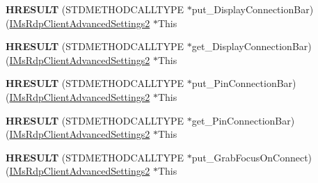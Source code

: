 \begin{DoxyCompactItemize}
\item 
\mbox{\label{struct_m_s_t_s_c_lib_1_1_i_ms_rdp_client_advanced_settings2_vtbl_ac35cbb3228dacc2c6289222c6b4a703f}} 
{\bfseries H\+R\+E\+S\+U\+LT} (S\+T\+D\+M\+E\+T\+H\+O\+D\+C\+A\+L\+L\+T\+Y\+PE $\ast$put\+\_\+\+Display\+Connection\+Bar)(\hyperlink{interface_m_s_t_s_c_lib_1_1_i_ms_rdp_client_advanced_settings2}{I\+Ms\+Rdp\+Client\+Advanced\+Settings2} $\ast$This
\item 
\mbox{\label{struct_m_s_t_s_c_lib_1_1_i_ms_rdp_client_advanced_settings2_vtbl_a38d3399d8e4496cb8055bca8e0daa706}} 
{\bfseries H\+R\+E\+S\+U\+LT} (S\+T\+D\+M\+E\+T\+H\+O\+D\+C\+A\+L\+L\+T\+Y\+PE $\ast$get\+\_\+\+Display\+Connection\+Bar)(\hyperlink{interface_m_s_t_s_c_lib_1_1_i_ms_rdp_client_advanced_settings2}{I\+Ms\+Rdp\+Client\+Advanced\+Settings2} $\ast$This
\item 
\mbox{\label{struct_m_s_t_s_c_lib_1_1_i_ms_rdp_client_advanced_settings2_vtbl_a02401a613d95616fcfa7d5df394a37dc}} 
{\bfseries H\+R\+E\+S\+U\+LT} (S\+T\+D\+M\+E\+T\+H\+O\+D\+C\+A\+L\+L\+T\+Y\+PE $\ast$put\+\_\+\+Pin\+Connection\+Bar)(\hyperlink{interface_m_s_t_s_c_lib_1_1_i_ms_rdp_client_advanced_settings2}{I\+Ms\+Rdp\+Client\+Advanced\+Settings2} $\ast$This
\item 
\mbox{\label{struct_m_s_t_s_c_lib_1_1_i_ms_rdp_client_advanced_settings2_vtbl_a27e24dda249635ca95ca5f88cfa25ff3}} 
{\bfseries H\+R\+E\+S\+U\+LT} (S\+T\+D\+M\+E\+T\+H\+O\+D\+C\+A\+L\+L\+T\+Y\+PE $\ast$get\+\_\+\+Pin\+Connection\+Bar)(\hyperlink{interface_m_s_t_s_c_lib_1_1_i_ms_rdp_client_advanced_settings2}{I\+Ms\+Rdp\+Client\+Advanced\+Settings2} $\ast$This
\item 
\mbox{\label{struct_m_s_t_s_c_lib_1_1_i_ms_rdp_client_advanced_settings2_vtbl_acf372a510757f19a62d46dedf5a98d6a}} 
{\bfseries H\+R\+E\+S\+U\+LT} (S\+T\+D\+M\+E\+T\+H\+O\+D\+C\+A\+L\+L\+T\+Y\+PE $\ast$put\+\_\+\+Grab\+Focus\+On\+Connect)(\hyperlink{interface_m_s_t_s_c_lib_1_1_i_ms_rdp_client_advanced_settings2}{I\+Ms\+Rdp\+Client\+Advanced\+Settings2} $\ast$This

\end{DoxyCompactItemize}
